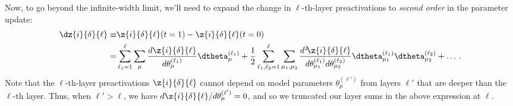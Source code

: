 Now, to go beyond 
the infinite-width limit,
we'll need to expand the change in $\ell$-th-layer preactivations to \emph{second order} in the parameter update:
\begin{align}\label{eq:preactivation-change-second-order-in-model-parameter}
\dz{i}{\delta}{\ell}\equiv&\z{i}{\delta}{\ell}(t=1)-\z{i}{\delta}{\ell}(t=0)\, \\
=&\sum_{\ell_1=1}^{\ell} \sum_{\mu}\frac{d\z{i}{\delta}{\ell}}{d\theta_{\mu}^{(\ell_1)}}\dtheta_{\mu}^{(\ell_1)}+\frac{1}{2}\sum_{\ell_1, \ell_2 = 1}^\ell \sum_{\mu_1,\mu_2}\frac{d^2\!\z{i}{\delta}{\ell}}{d\theta^{(\ell_1)}_{\mu_1}d\theta_{\mu_2}^{(\ell_2)}}\dtheta_{\mu_1}^{(\ell_1)}\dtheta_{\mu_2}^{(\ell_2)}+\ldots\, .\notag
\end{align}
Note that the $\ell$-th-layer preactivations $\z{i}{\delta}{\ell}$ cannot depend on model parameters $\theta_{\mu}^{(\ell')}$ from layers $\ell'$ that are deeper than the $\ell$-th layer.  Thus, when $\ell' > \ell$, we have $d\z{i}{\delta}{\ell}/d\theta_{\mu}^{(\ell')}=0$, and so we truncated our layer sums in the above expression at $\ell$.


